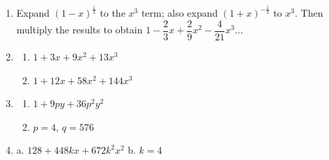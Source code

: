 \begin{enumerate}
\item Expand $(1 - x)^{\frac{1}{3}}$ to the $x^3$ term; also expand $(1 + x)^{-\frac{1}{3}}$ to $x^3$.
Then multiply the results to obtain $1 - \dfrac{2}{3}x + \dfrac{2}{9}x^2 - \dfrac{4}{21}x^3 \ldots$

\item
\begin{enumerate}
  \item[a.] $1 + 3x + 9x^2 + 13x^3$
  \item[b.] $1 + 12x + 58x^2 + 144x^3$
\end{enumerate}

\item
\begin{enumerate}
  \item[a.] $1 + 9py + 36p^2y^2$
  \item[b.] $p = 4$, $q = 576$
\end{enumerate}

\item a. $128 + 448kx + 672k^2x^2$ \quad b. $k = 4$
\end{enumerate}
